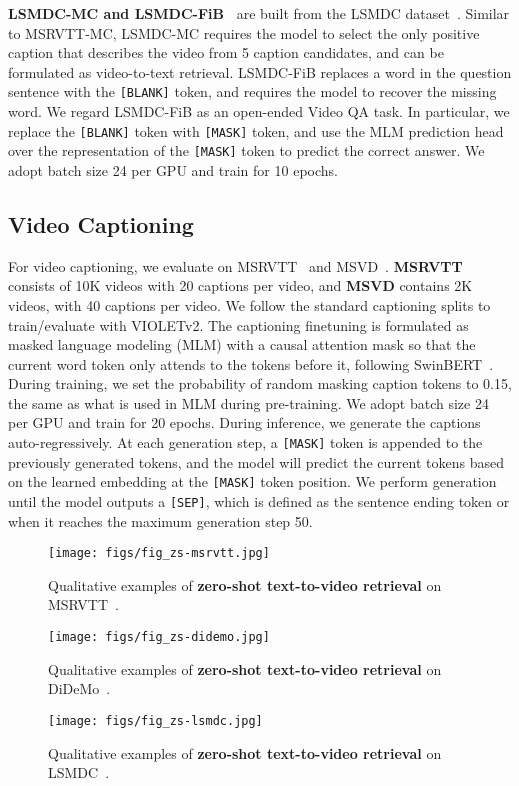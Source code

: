 \documentclass[10pt,twocolumn,letterpaper]{article}
\newcommand{\modelname}{VIOLETv2\xspace}
\begin{document}
\vspace{0.5ex}
\noindent \textbf{LSMDC-MC and LSMDC-FiB~\cite{torabi2016lsmdc-fib}} are built from the LSMDC dataset~\cite{rohrbach2015lsmdc}. Similar to MSRVTT-MC, LSMDC-MC requires the model to select the only positive caption that describes the video from 5 caption candidates, and can be formulated as video-to-text retrieval. LSMDC-FiB replaces a word in the question sentence with the \texttt{[BLANK]} token, and requires the model to recover the missing word.  We regard LSMDC-FiB as an open-ended Video QA task. In particular, we replace the \texttt{[BLANK]} token with \texttt{[MASK]} token, and use the MLM prediction head over the representation  of the \texttt{[MASK]} token to predict the correct answer. We adopt batch size 24 per GPU and train for 10 epochs.


\subsection{Video Captioning}
For video captioning, we evaluate on MSRVTT~\cite{xu2016msrvtt} and MSVD~\cite{chen2011msvd}. \textbf{MSRVTT} consists of 10K videos with 20 captions per video, and \textbf{MSVD} contains 2K videos, with 40 captions per video. We follow the standard captioning splits to train/evaluate with \modelname. The captioning finetuning is formulated as masked language modeling (MLM) with a causal attention mask so that the current word token only attends to the tokens before it, following SwinBERT~\cite{lin2022swin-bert}. During training, we set the probability of random masking caption tokens to 0.15, the same as what is used in MLM during pre-training. We adopt batch size 24 per GPU and train for 20 epochs. During inference, we generate the captions auto-regressively. At each generation step, a \texttt{[MASK]} token is appended to the previously generated tokens, and the model will predict the current tokens based on the learned embedding at the \texttt{[MASK]} token position. We perform generation until the model outputs a \texttt{[SEP]}, which is defined as the sentence ending token or when it reaches the maximum generation step 50. 
\clearpage
\begin{figure*}[t]
\centering
    \texttt{[image: figs/fig\_zs-msrvtt.jpg]}
    \caption{Qualitative examples of \textbf{zero-shot text-to-video retrieval} on MSRVTT~\cite{xu2016msrvtt}.}
    \label{fig:zs-msrvtt}
\end{figure*}
\clearpage
\begin{figure*}[t]
\centering
    \texttt{[image: figs/fig\_zs-didemo.jpg]}
    \caption{Qualitative examples of \textbf{zero-shot text-to-video retrieval} on DiDeMo~\cite{hendricks2017didemo}.}
    \label{fig:zs-didemo}
\end{figure*}
\clearpage
\begin{figure*}[t]
\centering
    \texttt{[image: figs/fig\_zs-lsmdc.jpg]}
    \caption{Qualitative examples of \textbf{zero-shot text-to-video retrieval} on LSMDC~\cite{rohrbach2015lsmdc}.}
    \label{fig:zs-lsmdc}
\end{figure*}
\end{document}
